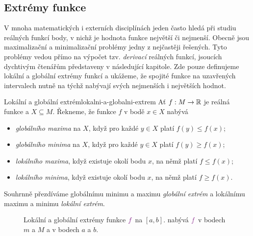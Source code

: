 \subsection{Extrémy funkce}
\label{ssec:extremy-funkce}

V mnoha matematických i externích disciplínách jeden často hledá při studiu
reálných funkcí body, v nichž je hodnota funkce největší či nejmenší. Obecně
jsou maximalizační a minimalizační problémy jedny z nejčastěji řešených. Tyto
problémy vedou přímo na výpočet tzv. \emph{derivací} reálných funkcí, jsoucích
dychtivým čtenářům představeny v následující kapitole. Zde pouze definujeme
lokální a globální extrémy funkcí a ukážeme, že spojité funkce na uzavřených
intervalech nutně na týchž nabývají svých nejmenších i největších hodnot.

\begin{definition}{Lokální a globální extrém}{lokalni-a-globalni-extrem}
 Ať $f:M \to \mathbb{R}$ je reálná funkce a $X \subseteq M$. Řekneme, že funkce $f$ v
 bodě $x \in X$ nabývá
 \begin{itemize}
  \item \emph{globálního maxima} na $X$, když pro každé $y \in X$ platí
   $f(y) \leq f(x)$;
  \item \emph{globálního minima} na $X$, když pro každé $y \in X$ platí $f(y)
   \geq f(x)$;
  \item \emph{lokálního maxima}, když existuje okolí bodu $x$, na němž platí $f
   \leq f(x)$;
  \item \emph{lokálního minima}, když existuje okolí bodu $x$, na němž platí $f
   \geq f(x)$.
 \end{itemize}
 Souhrnně přezdíváme globálnímu minimu a maximu \emph{globální extrém} a
 lokálnímu maximu a minimu \emph{lokální extrém}.
\end{definition}

\begin{figure}[ht]
 \centering
 \caption{Lokální a globální extrémy funkce $\clm{f}$ na $[a,b]$.  nabývá $\clm{f}$ v bodech $m$ a $M$ a  v
  bodech $a$ a $b$.}
 \label{fig:extremy}
\end{figure}

